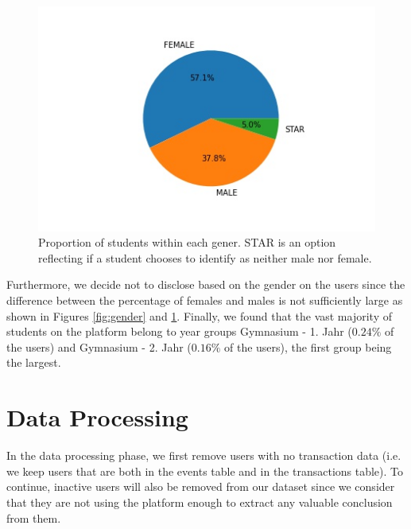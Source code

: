 \documentclass[sigplan,screen]{acmart}
\begin{document}
\begin{figure}[h]
    \centering
    \includegraphics[width=\linewidth]{reports/figures/pie_chart.jpg}
    \caption{Proportion of students within each gener. STAR is an option reflecting if a student chooses to identify as neither male nor female.}
    \label{fig:pie_chart}
\end{figure}

Furthermore, we decide not to disclose based on the gender on the users since the difference between the percentage of females and males is not sufficiently large as shown in Figures \ref{fig:gender} and \ref{fig:pie_chart}. Finally, we found that the vast majority of students on the platform belong to year groups Gymnasium - 1. Jahr ($0.24 \%$ of the users) and Gymnasium - 2. Jahr ($0.16 \%$ of the users), the first group being the largest.

\section{Data Processing} \label{data:cleaning}


In the data processing phase, we first remove users with no transaction data (i.e. we keep users that are both in the events table and in the transactions table). To continue, inactive users will also be removed from our dataset since we consider that they are not using the platform enough to extract any valuable conclusion from them.
\end{document}
